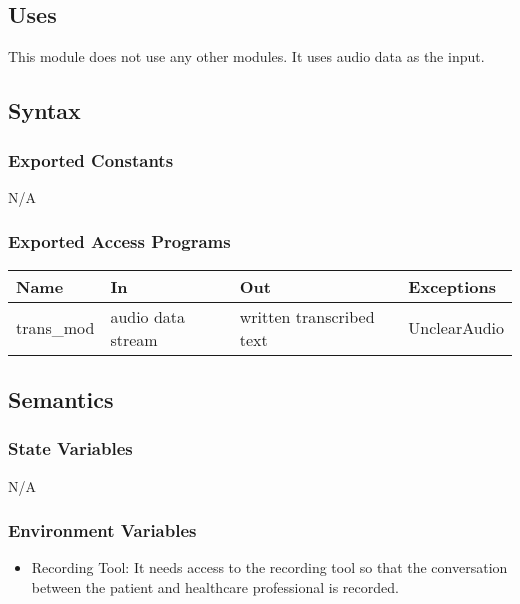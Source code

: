 \documentclass[12pt, titlepage]{article}
\begin{document}
\subsection{Uses}

This module does not use any other modules. It uses audio data as the input.

\subsection{Syntax}

\subsubsection{Exported Constants}

N/A

\subsubsection{Exported Access Programs}

\begin{center}
  \begin{tabular}{p{2cm} p{4cm} p{4cm} p{2cm}}
  \hline
  \textbf{Name} & \textbf{In} & \textbf{Out} & \textbf{Exceptions} \\
  \hline
  trans\_mod & audio data stream & written transcribed text & UnclearAudio \\ 
  \hline
  \end{tabular}
  \end{center}

\subsection{Semantics}

\subsubsection{State Variables}

N/A

\subsubsection{Environment Variables}

\begin{itemize}
  \item Recording Tool: It needs access to the recording tool so that the conversation between the patient and healthcare professional is recorded.
\end{itemize}
\end{document}
